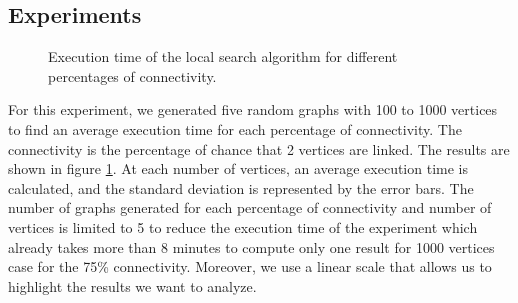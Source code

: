 
\subsection{Experiments}

\begin{figure}[H]
    \centering
    \caption{Execution time of the local search algorithm for different percentages of connectivity.}
    \label{fig:local_search_time}
\end{figure}

For this experiment, we generated five random graphs with 100 to 1000 vertices to find an average execution time for each percentage of connectivity. The connectivity is the percentage of chance that 2 vertices are linked. The results are shown in figure \ref{fig:local_search_time}. At each number of vertices, an average execution time is calculated, and the standard deviation is represented by the error bars. The number of graphs generated for each percentage of connectivity and number of vertices is limited to 5 to reduce the execution time of the experiment which already takes more than 8 minutes to compute only one result for 1000 vertices case for the 75\% connectivity. Moreover, we use a linear scale that allows us to highlight the results we want to analyze.